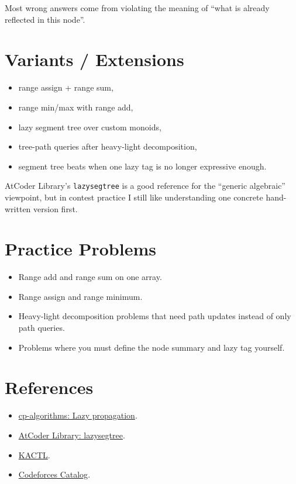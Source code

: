 Most wrong answers come from violating the meaning of ``what is already reflected in this node''.

\section*{Variants / Extensions}

\begin{itemize}
  \item range assign + range sum,
  \item range min/max with range add,
  \item lazy segment tree over custom monoids,
  \item tree-path queries after heavy-light decomposition,
  \item segment tree beats when one lazy tag is no longer expressive enough.
\end{itemize}

AtCoder Library's \texttt{lazysegtree} is a good reference for the ``generic algebraic'' viewpoint, but in contest
practice I still like understanding one concrete hand-written version first.

\section*{Practice Problems}

\begin{itemize}
  \item Range add and range sum on one array.
  \item Range assign and range minimum.
  \item Heavy-light decomposition problems that need path updates instead of only path queries.
  \item Problems where you must define the node summary and lazy tag yourself.
\end{itemize}

\section*{References}

\begin{itemize}
  \item \href{https://cp-algorithms.com/data_structures/segment_tree.html#range-updates-lazy-propagation}{cp-algorithms: Lazy propagation}.
  \item \href{https://atcoder.github.io/ac-library/production/document_en/lazysegtree.html}{AtCoder Library: lazysegtree}.
  \item \href{https://github.com/kth-competitive-programming/kactl}{KACTL}.
  \item \href{https://codeforces.com/catalog}{Codeforces Catalog}.
\end{itemize}
